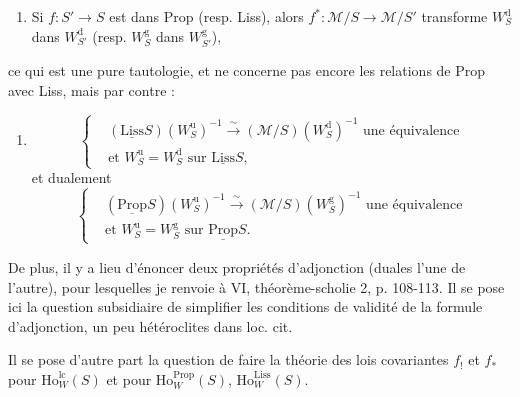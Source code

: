 \begin{enumerate}
\item[{\circled{a}}] Si $f : S' \longrightarrow S$ est dans Prop (resp. Liss), alors $f^* : \mathcal{M}/S \longrightarrow \mathcal{M}/S'$ transforme $W^{\mathrm{d}}_S$ dans $W^{\mathrm{d}}_{S'}$ (resp. $W^{\mathrm{g}}_S$ dans $W^{\mathrm{g}}_{S'}$),
\end{enumerate}
\noindent ce qui est une pure tautologie, et ne concerne pas encore les relations de Prop avec Liss, mais par contre :

\begin{enumerate}
\item[{\circled{b}}]
\[
\left\{
\begin{aligned}
&(\underline{\mathrm{Liss}}S)(W^{\mathrm{u}}_S)^{-1} \xrightarrow{\sim} (\mathcal{M}/S)(W^{\mathrm{d}}_S)^{-1} \text{ une équivalence}\\
&\text{et } W^{\mathrm{u}}_S = W^{\mathrm{d}}_S \text{ sur } \underline{\mathrm{Liss}}S,
\end{aligned}
\right.
\]
et dualement
\[
\left\{
\begin{aligned}
&(\underline{\mathrm{Prop}}S)(W^{\mathrm{u}}_S)^{-1} \xrightarrow{\sim} (\mathcal{M}/S)(W^{\mathrm{g}}_S)^{-1} \text{ une équivalence}\\
&\text{et } W^{\mathrm{u}}_S = W^{\mathrm{g}}_S \text{ sur } \underline{\mathrm{Prop}}S.
\end{aligned}
\right.
\]
\end{enumerate}

De plus, il y a lieu d'énoncer  deux propriétés d'adjonction (duales l'une de l'autre), pour lesquelles je renvoie à VI, théorème-scholie 2, p. 108-113. Il se pose ici la question subsidiaire de simplifier les conditions de validité de la formule d'adjonction, un peu hétéroclites dans loc. cit.

Il se pose d'autre part la question de faire la théorie des lois covariantes $f_!$ et $f_*$ pour $\mathrm{Ho}^{\mathrm{lc}}_W(S)$ et pour $\mathrm{Ho}^{\mathrm{Prop}}_W(S)$, $\mathrm{Ho}^{\mathrm{Liss}}_W(S)$.


